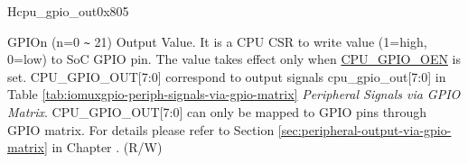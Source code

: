 \begin{register}{H}{cpu\_gpio\_out}{0x805}\label{regdesc:GPIO_OUT}
%
%
%
%
%
%
%
%
%
\regnewline%
\begin{regdesc}\begin{reglist}
\label{fielddesc:GPIO_OUT}\item [CPU\_GPIO\_OUT] GPIOn (n=0 \verb+~+ 21) Output Value. It is a CPU CSR to write value (1=high, 0=low) to SoC GPIO pin. The value takes effect only when \hyperref[fielddesc:GPIO_OEN]{CPU\_GPIO\_OEN} is set.
\newline CPU\_GPIO\_OUT[7:0] correspond to output signals cpu\_gpio\_out[7:0] in Table \ref{tab:iomuxgpio-periph-signals-via-gpio-matrix} \textit{Peripheral Signals via GPIO Matrix}.
\newline CPU\_GPIO\_OUT[7:0] can only be mapped to GPIO pins through GPIO matrix. For details please refer to Section \ref{sec:peripheral-output-via-gpio-matrix} in Chapter \textit{}. (R/W)
\end{reglist}\end{regdesc}
\end{register}
